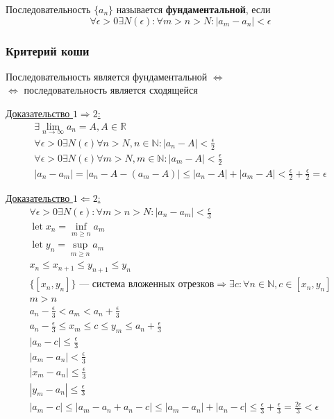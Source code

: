 \documentclass{article}
\DeclareMathOperator*{\Let}{let}
\begin{document}
Последовательность $\{ a_n \}$ называется \textbf{фундаментальной}, если \[
\forall \epsilon > 0 \exists N(\epsilon) : \forall m > n > N : |a_m - a_n| < \epsilon
\]

\subsubsection{Критерий коши}

Последовательность является фундаментальной $\Leftrightarrow$ \\
$\Leftrightarrow$ последовательность является сходящейся

\underline{Доказательство $1 \Rightarrow 2$:}
\begin{gather*}
	\exists \lim_{n \to \infty} a_n = A, A \in \mathbb{R} \\
	\forall \epsilon > 0 \exists N(\epsilon) \forall n > N, n \in \mathbb{N} :
	|a_n - A| < \frac{\epsilon}{2} \\
	\forall \epsilon > 0 \exists N(\epsilon) \forall m > N, m \in \mathbb{N} :
	|a_m - A| < \frac{\epsilon}{2} \\
	|a_n - a_m| = |a_n - A - (a_m - A)| \le |a_n - A| + |a_m - A| < \frac{\epsilon}{2} + \frac{\epsilon}{2} = \epsilon
\end{gather*}

\underline{Доказательство $1 \Leftarrow 2$:}
\begin{gather*}
	\forall \epsilon > 0 \exists N(\epsilon) : \forall m > n > N : |a_n - a_m| < \frac{\epsilon}{3} \\
	\Let x_n =\inf_{m \ge n} a_m \\
	\Let y_n =\sup_{m \ge n} a_m \\
	x_n \le x_{n+1} \le y_{n+1} \le y_n \\
	\{ [x_n, y_n] \} \text{ --- система вложенных отрезков} \Rightarrow \exists c : \forall n \in \mathbb{N}, c \in [x_n, y_n] \\
	m > n \\
	a_n - \frac{\epsilon}{3} < a_m < a_n + \frac{\epsilon}{3} \\
	a_n - \frac{\epsilon}{3} \le x_m \le c \le y_m \le a_n + \frac{\epsilon}{3} \\
	|a_n - c| \le \frac{\epsilon}{3} \\
	|a_m - a_n| < \frac{\epsilon}{3} \\
	|x_m - a_n| \le \frac{\epsilon}{3} \\
	|y_m - a_n| \le \frac{\epsilon}{3} \\
	|a_m - c| \le |a_m - a_n + a_n - c| \le |a_m - a_n| + |a_n - c| \le
	\frac{\epsilon}{3} + \frac{\epsilon}{3} = \frac{2\epsilon}{3} < \epsilon
\end{gather*}
\end{document}
